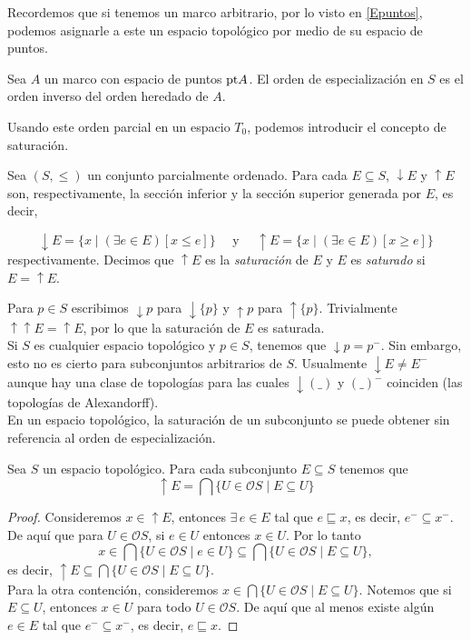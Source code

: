 Recordemos que si tenemos un marco arbitrario, por lo visto en \ref{Epuntos}, podemos asignarle a este un espacio topológico por medio de su espacio de puntos.

\begin{lem}
    Sea $A$ un marco con espacio de puntos $\mathrm{pt} A$. El orden de especialización en $S$ es el orden inverso del orden heredado de $A$.
\end{lem}

Usando este orden parcial en un espacio $T_0$, podemos introducir el concepto de saturación.

\begin{dfn}\label{SupInf}
    Sea $(S, \leq)$ un conjunto parcialmente ordenado. Para cada $E\subseteq S$, $\downarrow{E}$ y $\uparrow{E}$ son, respectivamente, la sección inferior y la sección superior generada por $E$, es decir,

    \[
    \downarrow{E}=\{x\mid (\exists e\in E) [x\leq e]\}\quad \mbox{ y } \quad \uparrow{E}=\{x\mid (\exists e\in E) [x\geq e]\}
    \]
    respectivamente. Decimos que $\uparrow{E}$ es la \emph{saturación} de $E$ y $E$ es \emph{saturado} si $E=\uparrow{E}$.
\end{dfn}

Para $p\in S$ escribimos $\downarrow{p}$ para $\downarrow{\{p\}}$ y $\uparrow{p}$ para $\uparrow{\{p\}}$. Trivialmente $\uparrow\uparrow{E}=\uparrow{E}$, por lo que la saturación de $E$ es saturada.\\

Si $S$ es cualquier espacio topológico y $p\in S$, tenemos que $\downarrow{p}=p^-$. Sin embargo, esto no es cierto para subconjuntos arbitrarios de $S$. Usualmente $\downarrow{E}\neq E^-$ aunque hay una clase de topologías para las cuales $\downarrow{(\_)}$ y $(\_)^-$ coinciden (las topologías de Alexandorff).\\

En un espacio topológico, la saturación de un subconjunto se puede obtener sin referencia al orden de especialización.

\begin{lem}\label{LemSup}
    Sea $S$ un espacio topológico. Para cada subconjunto $E\subseteq S$ tenemos que
    \[
    \uparrow{E}=\bigcap\{U\in \mathcal{O}S\mid E\subseteq U\}
    \]
\end{lem}

\begin{proof}
    Consideremos $x\in \uparrow{E}$, entonces $\exists\, e\in E$ tal que $e \sqsubseteq x$, es decir, $e^-\subseteq x^-$. De aquí que para $U\in\mathcal{O}S$, si $e\in U$ entonces $x\in U$. Por lo tanto
    \[
    x\in \bigcap \{U\in \mathcal{O}S\mid e\in U\}\subseteq \bigcap \{U\in \mathcal{O}S\mid E\subseteq U\},
    \]
    es decir, $\uparrow E\subseteq \bigcap \{U\in \mathcal{O}S\mid E\subseteq U\}$.\\

    Para la otra contención, consideremos $x\in \bigcap\{U\in \mathcal{O}S\mid E\subseteq U\}$. Notemos que si $E\subseteq U$, entonces $x\in U$ para todo $U\in \mathcal{O}S$. De aquí que al menos existe algún $e\in E$ tal que $e^-\subseteq x^-$, es decir, $e\sqsubseteq x$. 
\end{proof}

